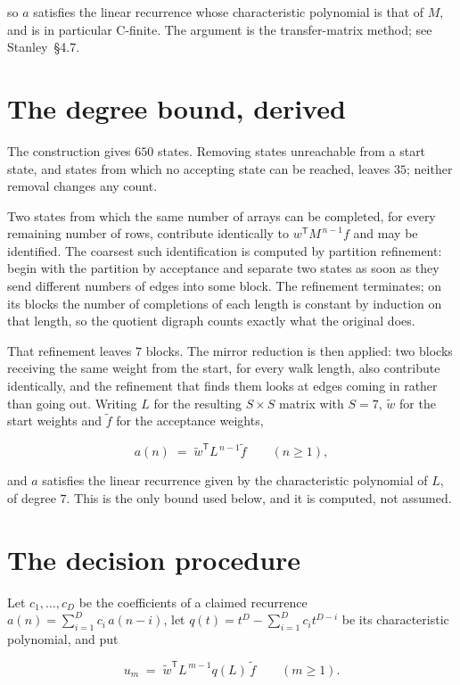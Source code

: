 \documentclass[11pt]{article}
\theoremstyle{definition}
\begin{document}
so $a$ satisfies the linear recurrence whose characteristic polynomial is that of $M$, and is in particular C-finite. The argument is the transfer-matrix method; see Stanley~\S4.7.

\section{The degree bound, derived}

The construction gives $650$ states. Removing states unreachable from a start state, and states from which no accepting state can be reached, leaves $35$; neither removal changes any count.

Two states from which the same number of arrays can be completed, for every remaining number of rows, contribute identically to $w^{\mathsf T}M^{\,n-1}f$ and may be identified. The coarsest such identification is computed by partition refinement: begin with the partition by acceptance and separate two states as soon as they send different numbers of edges into some block. The refinement terminates; on its blocks the number of completions of each length is constant by induction on that length, so the quotient digraph counts exactly what the original does.

That refinement leaves $7$ blocks. The mirror reduction is then applied: two blocks receiving the same weight from the start, for every walk length, also contribute identically, and the refinement that finds them looks at edges coming in rather than going out. Writing $L$ for the resulting $S \times S$ matrix with $S = 7$, $\tilde w$ for the start weights and $\tilde f$ for the acceptance weights,

\[a(n) \;=\; \tilde w^{\mathsf T} L^{\,n-1} \tilde f \qquad (n \ge 1),\]

and $a$ satisfies the linear recurrence given by the characteristic polynomial of $L$, of degree $7$. This is the only bound used below, and it is computed, not assumed.

\section{The decision procedure}

Let $c_1,\dots,c_D$ be the coefficients of a claimed recurrence $a(n) = \sum_{i=1}^{D} c_i\,a(n-i)$, let $q(t) = t^{D} - \sum_{i=1}^{D} c_i t^{D-i}$ be its characteristic polynomial, and put

\[u_m \;=\; \tilde w^{\mathsf T} L^{\,m-1} q(L)\,\tilde f \qquad (m \ge 1).\]
\end{document}
